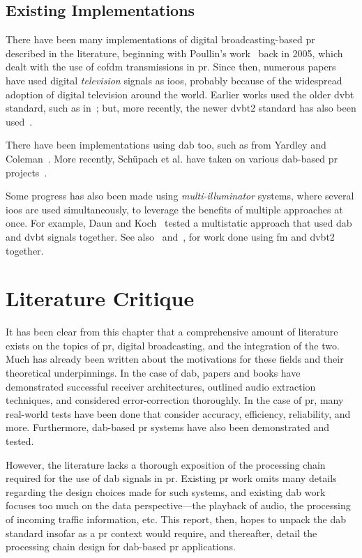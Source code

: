 \documentclass[class=report,11pt,crop=false]{standalone}
\begin{document}
\subsection{Existing Implementations}
There have been many implementations of digital broadcasting-based \gls{pr} described in the literature, beginning with Poullin's work~\cite{Poullin2005} back in 2005, which dealt with the use of \gls{cofdm} transmissions in \gls{pr}. Since then, numerous papers have used digital \emph{television} signals as \gls{ioo}s, probably because of the widespread adoption of digital television around the world. Earlier works used the older \gls{dvbt} standard, such as in~\cite{radmard2012feasibility, palmer2011overview,Peto2014}; but, more recently, the newer \gls{dvbt2} standard has also been used~\cite{OHagan2018, Low2019}.

There have been implementations using \gls{dab} too, such as from Yardley and Coleman~\cite{Yardley2007, Coleman2008}. More recently, Sch\"upach et al. have taken on various \gls{dab}-based \gls{pr} projects~\cite{Schupbach2017, Moser2019}.

Some progress has also been made using \emph{multi-illuminator} systems, where several \gls{ioo}s are used simultaneously, to leverage the benefits of multiple approaches at once. For example, Daun and Koch~\cite{Daun2007} tested a multistatic approach that used \gls{dab} and \gls{dvbt} signals together. See also~\cite{Edrich2014} and~\cite{Paine2018}, for work done using \gls{fm} and \gls{dvbt2} together.

\section{Literature Critique}
It has been clear from this chapter that a comprehensive amount of literature exists on the topics of \gls{pr}, digital broadcasting, and the integration of the two. Much has already been written about the motivations for these fields and their theoretical underpinnings. In the case of \gls{dab}, papers and books have demonstrated successful receiver architectures, outlined audio extraction techniques, and considered error-correction thoroughly. In the case of \gls{pr}, many real-world tests have been done that consider accuracy, efficiency, reliability, and more. Furthermore, \gls{dab}-based \gls{pr} systems have also been demonstrated and tested.

However, the literature lacks a thorough exposition of the processing chain required for the use of \gls{dab} signals in \gls{pr}. Existing \gls{pr} work omits many details regarding the design choices made for such systems, and existing \gls{dab} work focuses too much on the data perspective---the playback of audio, the processing of incoming traffic information, etc. This report, then, hopes to unpack the \gls{dab} standard insofar as a \gls{pr} context would require, and thereafter, detail the processing chain design for \gls{dab}-based \gls{pr} applications.

\ifstandalone

\printnoidxglossary[type=\acronymtype,nonumberlist]
\fi
\end{document}
